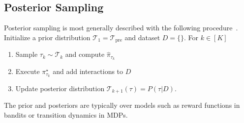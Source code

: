 \documentclass{article}
\newcommand{\Tcal}{{\mathcal{T}}}
\newcommand{\pretraint}{\Tcal_{\text{pre}}}
\newcommand{\pistar}{\pi^{\star}}
\begin{document}
\subsection{Posterior Sampling}
Posterior sampling is most generally described with the following procedure~\citep{osband2013more}. Initialize a prior distribution $\Tcal_1 = \pretraint$ and dataset $D = \{\}$. For $k \in [K]$
\begin{enumerate}
    \item Sample $\tau_k \sim \Tcal_k$ and compute $\hat \pi_{\tau_k}   $
    \item Execute $\pistar_{\tau_k}$ and add interactions to $D$
    \item Update posterior distribution $\Tcal_{k + 1}(\tau) = P( \tau | D)$.
\end{enumerate}
The prior and posteriors are typically over models such as reward functions in bandits or transition dynamics in MDPs.
\end{document}
